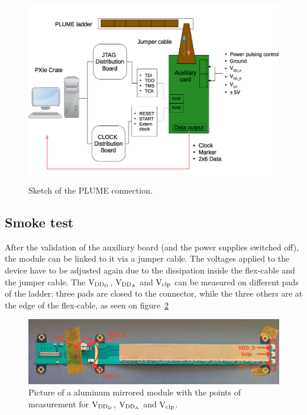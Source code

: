   \begin{figure}[!h]
    \centering
    \includegraphics[width=\textwidth]{Pictures/labTests/plumeAux.png}
    \caption{Sketch of the PLUME connection.}
    \label{fig:plumeAux}
  \end{figure}

  \subsection{Smoke test}

  After the validation of the auxiliary board (and the power supplies switched off), the module can be linked to it via a jumper cable.
  The voltages applied to the device have to be adjusted again due to the dissipation inside the flex-cable and the jumper cable.
  The $\rm{V}_{\rm{DD_D}}$, $\rm{V}_{\rm{DD_A}}$ and $\rm{V}_{\rm{clp}}$ can be measured on different pads of the ladder: three pads are closed to the connector, while the three others are at the edge of the flex-cable, as seen on figure~\ref{fig:voltagePads}

  \begin{figure}[!h]
    \centering
    \includegraphics[width=\textwidth]{Pictures/labTests/AM01_voltagePads.jpg}
    \caption{Picture of a aluminum mirrored module with the points of measurement for $\rm{V}_{\rm{DD_D}}$, $\rm{V}_{\rm{DD_A}}$ and $\rm{V}_{\rm{clp}}$.}
    \label{fig:voltagePads}
  \end{figure}

